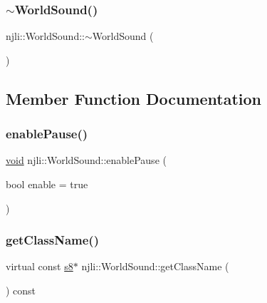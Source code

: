 \mbox{\label{classnjli_1_1_world_sound_a2fb62ddebed62016ca546b1f496bac17}} 
\subsubsection{\texorpdfstring{$\sim$\+World\+Sound()}{~WorldSound()}}
{\footnotesize\ttfamily njli\+::\+World\+Sound\+::$\sim$\+World\+Sound (\begin{DoxyParamCaption}{ }\end{DoxyParamCaption})}



\subsection{Member Function Documentation}
\mbox{\label{classnjli_1_1_world_sound_a48829ae6317cd2476854d36417f09b5c}} 
\subsubsection{\texorpdfstring{enable\+Pause()}{enablePause()}}
{\footnotesize\ttfamily \mbox{\hyperlink{_thread_8h_af1e856da2e658414cb2456cb6f7ebc66}{void}} njli\+::\+World\+Sound\+::enable\+Pause (\begin{DoxyParamCaption}\item[{bool}]{enable = {\ttfamily true} }\end{DoxyParamCaption})}

\mbox{\label{classnjli_1_1_world_sound_af737672a862c91dee7158f09ee646549}} 
\subsubsection{\texorpdfstring{get\+Class\+Name()}{getClassName()}}
{\footnotesize\ttfamily virtual const \mbox{\hyperlink{_util_8h_a2ff401e087cf786c38a6812723e94473}{s8}}$\ast$ njli\+::\+World\+Sound\+::get\+Class\+Name (\begin{DoxyParamCaption}{ }\end{DoxyParamCaption}) const\hspace{0.3cm}{\ttfamily [virtual]}}


